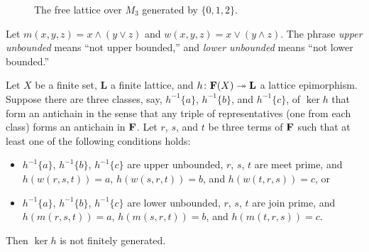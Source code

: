 \begin{figure}[!h]
    \caption{The free lattice over $M_3$ generated by $\{0, 1, 2\}$.}
    \label{fig:1}
  \end{figure}
  
Let $m(x,y,z) = x \wedge (y \vee z)$  and 
$w(x,y,z) = x \vee (y \wedge z)$.
The phrase \emph{upper unbounded}  means ``not upper bounded,''
and \emph{lower unbounded} means ``not lower bounded.''
\begin{proposition}
  \label{prop:2.2}
Let $X$ be a finite set, $\mathbf{L}$ a finite lattice, and 
$h\colon \mathbf{F}(X) \twoheadrightarrow \mathbf{L}$ a lattice epimorphism. 
Suppose there are three classes, say,
$h^{-1}\{a\}$, $h^{-1}\{b\}$, and $h^{-1}\{c\}$, of $\ker h$ 
that form an antichain in the sense that
any triple of representatives (one from each class) forms an antichain in $\mathbf{F}$.
Let $r$, $s$, and $t$ be three terms of $\mathbf{F}$
such that at least one of the following conditions holds:
\begin{itemize}
  \item $h^{-1}\{a\}$, $h^{-1}\{b\}$, $h^{-1}\{c\}$ are upper unbounded, 
  $r$, $s$, $t$ are meet prime, and 
  $h(w(r,s,t)) = a$, $h(w(s,r,t)) = b$, and $h(w(t,r,s)) = c$, or
  \item $h^{-1}\{a\}$, $h^{-1}\{b\}$, $h^{-1}\{c\}$ are lower unbounded, 
  $r$, $s$, $t$ are join prime, and 
    $h(m(r,s,t)) = a$, $h(m(s,r,t)) = b$, and $h(m(t,r,s)) = c$.
\end{itemize}
Then $\operatorname{ker}h$ is not finitely generated.  
\end{proposition}

